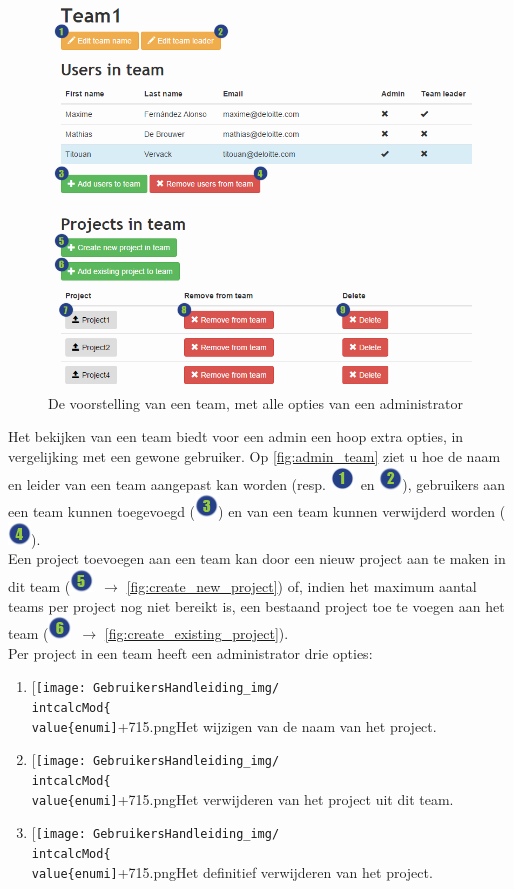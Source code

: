 \documentclass[a4paper,11pt]{article}
\newcommand{\one}{\includegraphics[scale=0.5]{Gebruikershandleiding_img/1.png}}
\newcommand{\two}{\includegraphics[scale=0.5]{Gebruikershandleiding_img/2.png}}
\newcommand{\three}{\includegraphics[scale=0.5]{Gebruikershandleiding_img/3.png}}
\newcommand{\four}{\includegraphics[scale=0.5]{Gebruikershandleiding_img/4.png}}
\newcommand{\five}{\includegraphics[scale=0.5]{Gebruikershandleiding_img/5.png}}
\newcommand{\six}{\includegraphics[scale=0.5]{Gebruikershandleiding_img/6.png}}
\newcommand*{\myzeven}{
 \item[{\texttt{[image: GebruikersHandleiding\_img/\\intcalcMod\{\\value\{enumi]}+7}{15}.png}}]\stepcounter{enumi}
\begin{document}
\begin{figure}[H]
\centering
\includegraphics[scale=0.5]{Gebruikershandleiding_img/admin_team.png}
\caption{De voorstelling van een team, met alle opties van een administrator}
\label{fig:admin_team}
\end{figure}

Het bekijken van een team biedt voor een admin een hoop extra opties, in vergelijking met een gewone gebruiker. Op \autoref{fig:admin_team} ziet u hoe de naam en leider van een team aangepast kan worden (resp. \one\ en \two), gebruikers aan een team kunnen toegevoegd (\three) en van een team kunnen verwijderd worden (\four).\\
Een project toevoegen aan een team kan door een nieuw project aan te maken in dit team (\five\ $\rightarrow$ \autoref{fig:create_new_project}) of, indien het maximum aantal teams per project nog niet bereikt is, een bestaand project toe te voegen aan het team (\six\ $\rightarrow$ \autoref{fig:create_existing_project}).\\
Per project in een team heeft een administrator drie opties:
\begin{enumerate}
\myzeven Het wijzigen van de naam van het project.
\myzeven Het verwijderen van het project uit dit team.
\myzeven Het definitief verwijderen van het project.
\end{enumerate}
\end{document}
